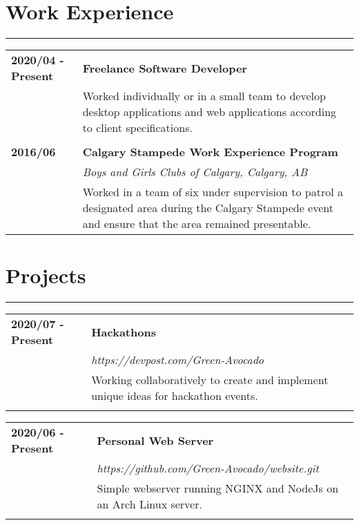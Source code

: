 \documentclass[letterpaper]{article}
\newcommand{\horizontalLine}{%
    \rule{\textwidth}{0.2pt}
    \vspace{1ex}
}
\begin{document}
    \newpage

    \section*{Work Experience}

        \horizontalLine

        \begin{tabular}{p{} p{}} 
            \textbf{2020/04 - Present} & \large\textbf{Freelance Software Developer} \\
            & Worked individually or in a small team to develop desktop applications and web applications according to client specifications. \\
            \\
            \textbf{2016/06} & \large\textbf{Calgary Stampede Work Experience Program} \\
            & \emph{Boys and Girls Clubs of Calgary, Calgary, AB} \\
            & Worked in a team of six under supervision to patrol a designated area during the Calgary Stampede event and ensure that the area remained presentable. \\
        \end{tabular}

    \section*{Projects}

        \horizontalLine

        \begin{tabular}{p{} p{}} 
            \textbf{2020/07 - Present} & \large\textbf{Hackathons} \\
            & \emph{https://devpost.com/Green-Avocado} \\
            & Working collaboratively to create and implement unique ideas for hackathon events. \\
            \\
        \end{tabular}

        \begin{tabular}{p{} p{}} 
            \textbf{2020/06 - Present} & \large\textbf{Personal Web Server} \\
            & \emph{https://github.com/Green-Avocado/website.git} \\
            & Simple webserver running NGINX and NodeJs on an Arch Linux server. \\
            \\
        \end{tabular}
\end{document}
